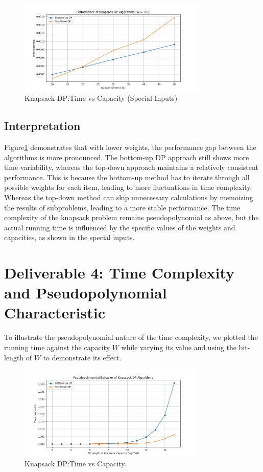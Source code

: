 \documentclass{article}
\begin{document}
\begin{figure}[ht]
    \centering
    \includegraphics[width=0.8\textwidth]{../knapsack_special_inputs_performance.png}
    \caption{Knapsack DP:Time vs Capacity (Special Inputs)}\label{fig:performance_special}
\end{figure}

\subsection{Interpretation}
Figure\ref{fig:performance_special} demonstrates that with lower weights, the performance gap between the algorithms is more pronounced. The bottom-up DP approach still shows more time variability, whereas the top-down approach maintains a relatively consistent performance. This is because the bottom-up method has to iterate through all possible weights for each item, leading to more fluctuations in time complexity.
Whereas the top-down method can skip unnecessary calculations by memoizing the results of subproblems, leading to a more stable performance.
The time complexity of the knapsack problem remains pseudopolynomial as above, but the actual running time is influenced by the specific values of the weights and capacities, as shown in the special inputs.


\section{Deliverable 4: Time Complexity and Pseudopolynomial Characteristic}
To illustrate the pseudopolynomial nature of the time complexity, we plotted the running time against the capacity \(W\) while varying its value and using the bit-length of \(W\) to demonstrate its effect.

\begin{figure}[ht]
    \centering
    \includegraphics[width=0.8\textwidth]{../pseudopolynomial_behavior.png}
    \caption{Knapsack DP:Time vs Capacity\@.}\label{fig:time_vs_capacity}
\end{figure}
\end{document}
